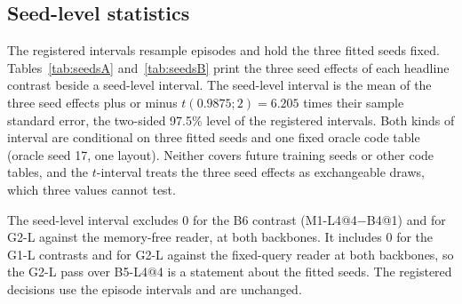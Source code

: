 \lsrtable

\subsection{Seed-level statistics}
\label{sec:seeds}

The registered intervals resample episodes and hold the three fitted seeds fixed.
Tables~\ref{tab:seedsA} and~\ref{tab:seedsB} print the three seed effects of each headline contrast beside a seed-level interval.
The seed-level interval is the mean of the three seed effects plus or minus $t(0.9875;2)=6.205$ times their sample standard error, the two-sided 97.5\% level of the registered intervals.  %
Both kinds of interval are conditional on three fitted seeds and one fixed oracle code table (oracle seed 17, one layout).
Neither covers future training seeds or other code tables, and the $t$-interval treats the three seed effects as exchangeable draws, which three values cannot test.

\begin{table}[htbp]
\centering\footnotesize
\caption{Qwen3-0.6B-Base: seed effects and intervals for the headline contrasts at rank 128 (pp).  %
}
\label{tab:seedsA}
\gtSeedsSmall
\end{table}

\begin{table}[htbp]
\centering\footnotesize
\caption{Qwen3-1.7B-Base: the same contrasts.  %
}
\label{tab:seedsB}
\gtSeedsLarge
\end{table}

The seed-level interval excludes 0 for the B6 contrast (M1-L4@4$-$B4@1) and for G2-L against the memory-free reader, at both backbones.
It includes 0 for the G1-L contrasts and for G2-L against the fixed-query reader at both backbones, so the G2-L pass over B5-L4@4 is a statement about the fitted seeds.
The registered decisions use the episode intervals and are unchanged.  %
